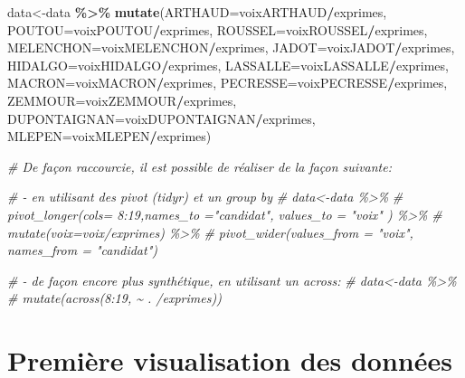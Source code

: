 \documentclass[
]{book}
\newenvironment{Shaded}{\begin{snugshade}}{\end{snugshade}}
\newcommand{\AttributeTok}[1]{\textcolor[rgb]{0.13,0.29,0.53}{#1}}
\newcommand{\CommentTok}[1]{\textcolor[rgb]{0.56,0.35,0.01}{\textit{#1}}}
\newcommand{\FunctionTok}[1]{\textcolor[rgb]{0.13,0.29,0.53}{\textbf{#1}}}
\newcommand{\NormalTok}[1]{#1}
\newcommand{\OtherTok}[1]{\textcolor[rgb]{0.56,0.35,0.01}{#1}}
\newcommand{\SpecialCharTok}[1]{\textcolor[rgb]{0.81,0.36,0.00}{\textbf{#1}}}
\begin{document}
\begin{Shaded}
\begin{Highlighting}[]
\NormalTok{data}\OtherTok{\textless{}{-}}\NormalTok{data }\SpecialCharTok{\%\textgreater{}\%}
  \FunctionTok{mutate}\NormalTok{(}\AttributeTok{ARTHAUD=}\NormalTok{voixARTHAUD}\SpecialCharTok{/}\NormalTok{exprimes,}
         \AttributeTok{POUTOU=}\NormalTok{voixPOUTOU}\SpecialCharTok{/}\NormalTok{exprimes,}
         \AttributeTok{ROUSSEL=}\NormalTok{voixROUSSEL}\SpecialCharTok{/}\NormalTok{exprimes,}
         \AttributeTok{MELENCHON=}\NormalTok{voixMELENCHON}\SpecialCharTok{/}\NormalTok{exprimes,}
         \AttributeTok{JADOT=}\NormalTok{voixJADOT}\SpecialCharTok{/}\NormalTok{exprimes,}
         \AttributeTok{HIDALGO=}\NormalTok{voixHIDALGO}\SpecialCharTok{/}\NormalTok{exprimes,}
         \AttributeTok{LASSALLE=}\NormalTok{voixLASSALLE}\SpecialCharTok{/}\NormalTok{exprimes,}
         \AttributeTok{MACRON=}\NormalTok{voixMACRON}\SpecialCharTok{/}\NormalTok{exprimes,}
         \AttributeTok{PECRESSE=}\NormalTok{voixPECRESSE}\SpecialCharTok{/}\NormalTok{exprimes,}
         \AttributeTok{ZEMMOUR=}\NormalTok{voixZEMMOUR}\SpecialCharTok{/}\NormalTok{exprimes,}
         \AttributeTok{DUPONTAIGNAN=}\NormalTok{voixDUPONTAIGNAN}\SpecialCharTok{/}\NormalTok{exprimes,}
         \AttributeTok{MLEPEN=}\NormalTok{voixMLEPEN}\SpecialCharTok{/}\NormalTok{exprimes)}


\CommentTok{\# De façon raccourcie, il est possible de réaliser de la façon suivante:}

\CommentTok{\# {-} en utilisant des pivot (tidyr) et un group by}
\CommentTok{\# data\textless{}{-}data \%\textgreater{}\%}
\CommentTok{\#   pivot\_longer(cols= 8:19,names\_to ="candidat", values\_to = "voix" ) \%\textgreater{}\%}
\CommentTok{\#   mutate(voix=voix/exprimes) \%\textgreater{}\%}
\CommentTok{\#   pivot\_wider(values\_from = "voix", names\_from = "candidat")}

\CommentTok{\# {-} de façon encore plus synthétique, en utilisant un across:}
\CommentTok{\# data\textless{}{-}data \%\textgreater{}\%}
\CommentTok{\#  mutate(across(8:19, \textasciitilde{} . /exprimes))}
\end{Highlighting}
\end{Shaded}

\hypertarget{premiuxe8re-visualisation-des-donnuxe9es}{%
\section{Première visualisation des données}\label{premiuxe8re-visualisation-des-donnuxe9es}}
\end{document}
